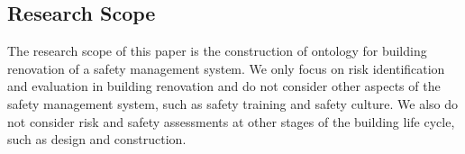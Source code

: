 
\subsection*{Research Scope}
\label{sec:research_scope}
The research scope of this paper is the construction of ontology for building renovation of a safety management system. 
We only focus on risk identification and evaluation in building renovation and do not consider other aspects of the safety management system, such as safety training and safety culture.
We also do not consider risk and safety assessments at other stages of the building life cycle, such as design and construction.





